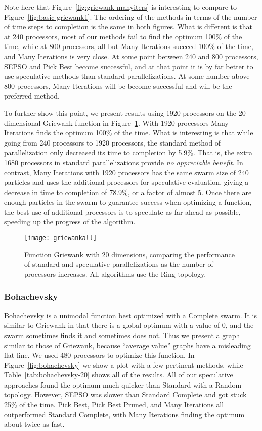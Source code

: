 \documentclass[smallcondensed]{svjour3}
\newcommand{\fig}[1]{Figure~\ref{fig:#1}}
\newcommand{\tabref}[1]{Table~\ref{tab:#1}}
\begin{document}
Note here that \fig{griewank-manyiters} is interesting to compare to
\fig{basic-griewank1}.  The ordering of the methods in terms of the number of
time steps to completion is the same in both figures.  What is different is
that at 240 processors, most of our methods fail to find the optimum 100\% of
the time, while at 800 processors, all but Many Iterations succeed 100\% of the
time, and Many Iterations is very close.  At some point between 240 and 800
processors, SEPSO and Pick Best become successful, and at that point it is by
far better to use speculative methods than standard parallelizations.  At some
number above 800 processors, Many Iterations will be become successful and will
be the preferred method.

To further show this point, we present results using 1920 processors on the
20-dimensional Griewank function in \fig{griewank-all}.  With 1920 processors
Many Iterations finds the optimum 100\% of the time.  What is interesting is
that while going from 240 processors to 1920 processors, the standard method of
parallelization only decreased its time to completion by 5.9\%.  That is, the
extra 1680 processors in standard parallelizations provide \emph{no appreciable
benefit}.  In contrast, Many Iterations with 1920 processors has the same swarm
size of 240 particles and uses the additional processors for speculative
evaluation, giving a decrease in time to completion of 78.9\%, or a factor of
almost 5.  Once there are enough particles in the swarm to guarantee success
when optimizing a function, the best use of additional processors is to
speculate as far ahead as possible, speeding up the progress of the algorithm.

\begin{figure}
  \centering
  \texttt{[image: griewankall]}
  \caption{Function Griewank with 20 dimensions, comparing the performance of
  standard and speculative parallelizations as the number of processors
  increases.  All algorithms use the Ring topology.}
  \label{fig:griewank-all}
\end{figure}

\subsubsection{Bohachevsky}

Bohachevsky is a unimodal function best optimized with a Complete swarm.  It is
similar to Griewank in that there is a global optimum with a value of 0, and
the swarm sometimes finds it and sometimes does not.  Thus we present a graph
similar to those of Griewank, because ``average value'' graphs have a
misleading flat line.  We used 480 processors to optimize this function.  In
\fig{bohachevsky} we show a plot with a few pertinent methods, while
\tabref{bohachevsky-20} shows all of the results.  All of our speculative
approaches found the optimum much quicker than Standard with a Random topology.
However, SEPSO was slower than Standard Complete and got stuck 25\% of the
time.  Pick Best, Pick Best Pruned, and Many Iterations all outperformed
Standard Complete, with Many Iterations finding the optimum about twice as
fast.
\end{document}
